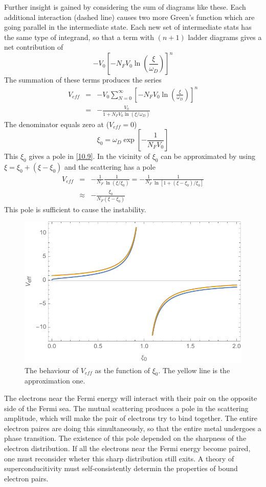 Further insight is gained by considering the sum of diagrams like these.
Each additional interaction (dashed line) causes two more Green's function which are going parallel in the intermediate state.
Each new set of intermediate stats has the same type of integrand, so that a term with $(n+1)$ ladder diagrams gives a net contribution of
\begin{equation}
    -V_0 \left[ -N_F V_0 \ln \left( \frac{\xi}{\omega_D} \right) \right]^n      \label{10.7}
\end{equation}
The summation of these terms produces the series
\begin{eqnarray}
    V_{eff} &=& -V_0 \sum_{N=0}^\infty \left[ -N_F V_0 \ln \left( \frac{\xi}{\omega_D} \right) \right]^n \nonumber \\
    &=& - \frac{V_0}{1+N_F V_0 \ln \left( \xi/\omega_D \right)}  \label{10.9}
\end{eqnarray}
The denominator equals zero at ($V_{eff}=0$)
\begin{equation}
    \xi_0 = \omega_D \exp \left[ - \frac{1}{N_F V_0} \right]    \label{10.10}
\end{equation}
This $\xi_0$ gives a pole in \eqref{10.9}.
In the vicinity of $\xi_0$ can be approximated by using $\xi = \xi_0 + \left( \xi - \xi_0 \right)$ and the scattering has a pole
\begin{eqnarray}
    V_{eff} &=& - \frac{1}{N_F} \frac{1}{\ln(\xi/\xi_0)} = - \frac{1}{N_F} \frac{1}{\ln \left[ 1 + (\xi-\xi_0)/\xi_0 \right]}   \nonumber \\
    &\approx&- \frac{\xi_0}{N_F(\xi- \xi_0)}     \label{10.11}
\end{eqnarray}
This pole is sufficient to cause the instability.
\begin{figure}[ht]
    \centering
    \includegraphics[width=0.55\linewidth]{./fig/fig_eq_10_11.pdf}
    \caption{The behaviour of $V_{eff}$ as the function of $\xi_0$. The yellow line is the approximation one.}%
    \label{fig:eq_10_1}
\end{figure}
The electrons near the Fermi energy will interact with their pair on the opposite side of the Fermi sea.
The mutual scattering produces a pole in the scattering amplitude, which will make the pair of electrons try to bind together.
The entire electron paires are doing this simultaneously, so that the entire metal undergoes a phase transition.
The existence of this pole depended on the sharpness of the electron distribution.
If all the electrons near the Fermi energy become paired, one must reconsider wheter this sharp distribution still exits.
A theory of superconducitivity must self-consistently determin the properties of bound electron pairs.


